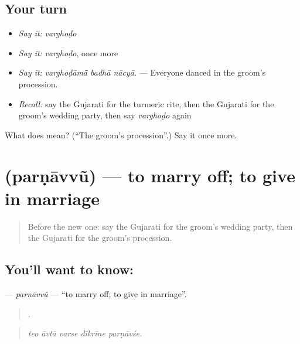 \subsection*{Your turn}
\begin{itemize}
\raggedright
  \item \emph{Say it:} \emph{varghoḍo}
  \item \emph{Say it:} \emph{varghoḍo}, once more
  \item \emph{Say it:} \emph{varghoḍāmā̃ badhā nācyā.} — Everyone danced in the groom's procession.
  \item \emph{Recall:} say the Gujarati for the turmeric rite, then the Gujarati for the groom's wedding party, then say \emph{varghoḍo} again
\end{itemize}

\begin{tcolorbox}[breakable,colback=teal!4,colframe=teal!35!black,title={Before you move on}]
What does  mean? (\textquotedblleft{}The groom's procession\textquotedblright{}.) Say it once more.
\end{tcolorbox}
\section[\texorpdfstring{\gu{પરણાવવું} (parṇāvvũ)}{પરણાવવું (parṇāvvũ)}]{ (parṇāvvũ) — to marry off; to give in marriage}

\label{lesson:GU-C497-parnavvu}



\begin{quote}
Before the new one: say the Gujarati for the groom's wedding party, then the Gujarati for the groom's procession.
\end{quote}

\subsection*{You'll want to know: }
\textbf{} — \emph{parṇāvvũ} — \textquotedblleft{}to marry off; to give in marriage\textquotedblright{}.

\begin{quote}
    .
\end{quote}

\begin{quote}
\emph{teo āvtā varse dīkrīne parṇāvśe.}
\end{quote}

